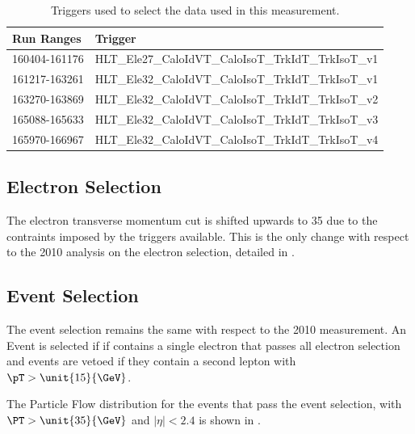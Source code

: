 \begin{table}[htbp]
  \begin{center}
    \leavevmode
     \begin{tabular}{ll} 
\toprule
      Run Ranges & Trigger  \\
     \midrule
     160404-161176 & HLT\_Ele27\_CaloIdVT\_CaloIsoT\_TrkIdT\_TrkIsoT\_v1  \\
     161217-163261 & HLT\_Ele32\_CaloIdVT\_CaloIsoT\_TrkIdT\_TrkIsoT\_v1  \\
     163270-163869 & HLT\_Ele32\_CaloIdVT\_CaloIsoT\_TrkIdT\_TrkIsoT\_v2  \\
     165088-165633 & HLT\_Ele32\_CaloIdVT\_CaloIsoT\_TrkIdT\_TrkIsoT\_v3  \\
     165970-166967 & HLT\_Ele32\_CaloIdVT\_CaloIsoT\_TrkIdT\_TrkIsoT\_v4  \\
\bottomrule
     \end{tabular}
  \caption{Triggers used to select the data used in this measurement.}
  \label{tab:updatedtriggers}
   \end{center}
\end{table}

\subsection{Electron Selection}

The electron transverse momentum cut is shifted upwards to \unit{35}{\GeV} due
to the contraints imposed by the triggers available.  This is the only change
with respect to the 2010 analysis on the electron selection, detailed in
.

\subsection{Event Selection}
The event selection remains the same with respect to the 2010 measurement.
An Event is selected if if contains a single electron that passes all electron
selection and events are vetoed if they contain a second lepton with
$\pT>\unit{15}{\GeV}$.

The Particle Flow \ETm distribution for the events that pass the event
selection, with $\PT > \unit{35}{\GeV}$ and $|\eta| < 2.4$ is shown in
.

